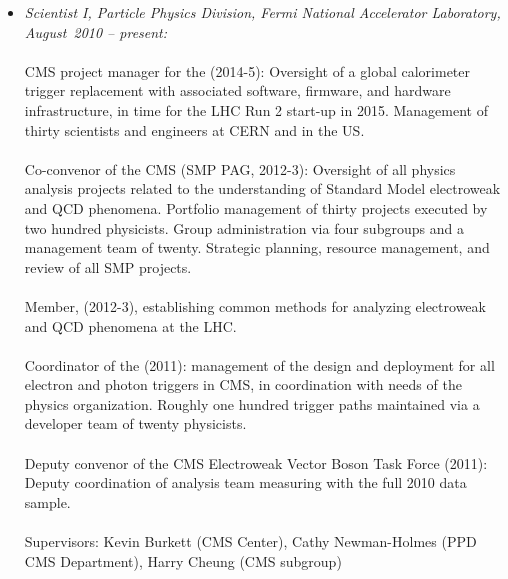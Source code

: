 \documentclass [12pt]{report}
\begin{document}
\begin{itemize}
\item{{\em Scientist I, Particle Physics Division, Fermi National Accelerator Laboratory,\\
 August~2010 -- present:} \\ \\
CMS project manager for the  (2014-5): Oversight of a global calorimeter trigger replacement with associated software, firmware, and hardware infrastructure, in time for the LHC Run 2 start-up in 2015.  Management of thirty scientists and engineers at CERN and in the US.  
\\ \\
Co-convenor of the CMS  (SMP PAG, 2012-3): Oversight of all physics analysis projects related to the understanding of Standard Model electroweak and QCD phenomena.  Portfolio management of thirty projects executed by two hundred physicists. Group administration via four subgroups and a management team of twenty.  Strategic planning, resource management, and review of all SMP projects.     
\\ \\
Member,  (2012-3), establishing common methods for analyzing electroweak and QCD phenomena at the LHC.
\\ \\
Coordinator of the  (2011): management of the design and deployment for all electron and photon triggers in CMS, in coordination with needs of the physics organization.  Roughly one hundred trigger paths maintained via a developer team of twenty physicists.
\\ \\
Deputy convenor of the CMS Electroweak Vector Boson Task Force (2011): Deputy coordination of analysis team measuring  with the full 2010 data sample.
\\ \\
Supervisors: Kevin Burkett (CMS Center), Cathy Newman-Holmes (PPD CMS Department), Harry Cheung (CMS subgroup)
}     


\end{itemize}
\end{document}

